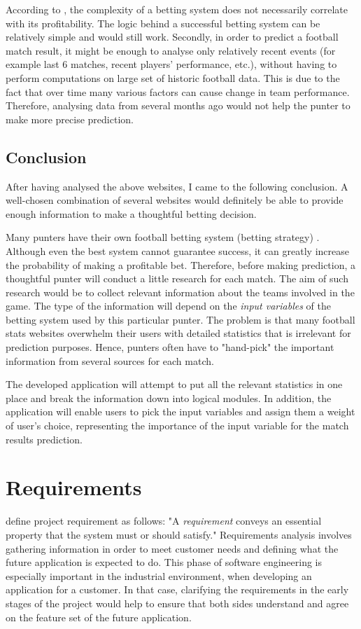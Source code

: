 According to \citet{art:simplebettingsystem}, the complexity of a betting system does not necessarily correlate with its profitability. The logic behind a successful betting system can be relatively simple and would still work. Secondly, in order to predict a football match result, it might be enough to analyse only relatively recent events (for example last 6 matches, recent players' performance, etc.), without having to perform computations on large set of historic football data. This is due to the fact that over time many various factors can cause change in team performance. Therefore, analysing data from several months ago would not help the punter to make more precise prediction.

\subsection{Conclusion}
After having analysed the above websites, I came to the following conclusion. A well-chosen combination of several websites would definitely be able to provide enough information to make a thoughtful betting decision.

Many punters have their own football betting system (betting strategy) \cite{art:simplebettingsystem}. Although even the best system cannot guarantee success, it can greatly increase the probability of making a profitable bet. Therefore, before making prediction, a thoughtful punter will conduct a little research for each match. The aim of such research would be to collect relevant information about the teams involved in the game. The type of the information will depend on the \emph{input variables} of the betting system used by this particular punter. The problem is that many football stats websites overwhelm their users with detailed statistics that is irrelevant for prediction purposes. Hence, punters often have to "hand-pick" the important information from several sources for each match. 
 	
The developed application will attempt to put all the relevant statistics in one place and break the information down into logical modules. In addition, the application will enable users to pick the input variables and assign them a weight of user's choice, representing the importance of the input variable for the match results prediction.
 
\section{Requirements}
\label{sec:requirements_req}
 \citet{book:radice1998software} define project requirement as follows: "A \emph{requirement} conveys an essential property that the system must or should satisfy." Requirements analysis involves gathering information in order to meet customer needs and defining what the future application is expected to do. 
This phase of software engineering is especially important in the industrial environment, when developing an application for a customer. In that case, clarifying the requirements in the early stages of the project would help to ensure that both sides understand and agree on the feature set of the future application. 

